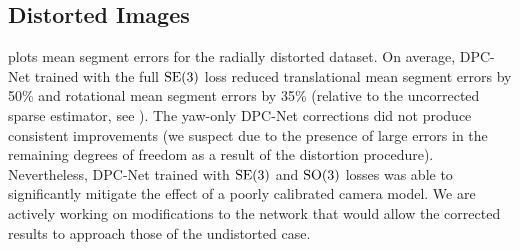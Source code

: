 \subsection{Distorted Images}

 plots mean segment errors for the radially distorted dataset. On average, DPC-Net trained with the full $\mathrm{SE}(3)$ loss reduced translational mean segment errors by 50\% and rotational mean segment errors by 35\% (relative to the uncorrected sparse estimator, see ). The yaw-only DPC-Net corrections did not produce consistent improvements (we suspect due to the presence of large errors in the remaining degrees of freedom as a result of the distortion procedure). Nevertheless, DPC-Net trained with $\mathrm{SE}(3)$ and $\mathrm{SO}(3)$ losses was able to significantly mitigate the effect of a poorly calibrated camera model. We are actively working on modifications to the network that would allow the corrected results to approach those of the undistorted case.


